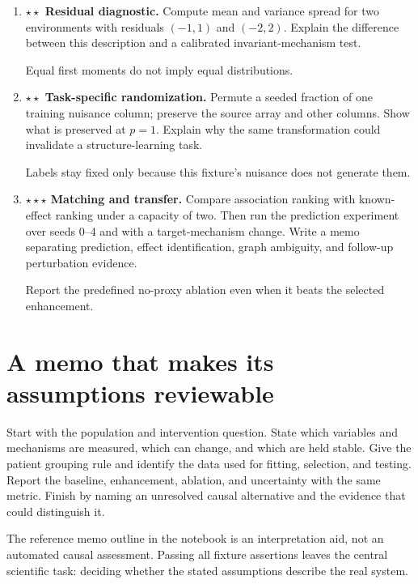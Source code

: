 \documentclass[11pt,oneside]{scrbook}
\begin{document}
\begin{enumerate}
\item \textbf{$\star\star$ Residual diagnostic.} Compute mean and variance spread for
two environments with residuals $(-1,1)$ and $(-2,2)$. Explain the difference between
this description and a calibrated invariant-mechanism test.
\begin{intuition}Equal first moments do not imply equal distributions.\end{intuition}

\item \textbf{$\star\star$ Task-specific randomization.} Permute a seeded fraction of
one training nuisance column; preserve the source array and other columns. Show what
is preserved at $p=1$. Explain why the same transformation could invalidate a
structure-learning task.
\begin{intuition}Labels stay fixed only because this fixture's nuisance does not generate them.\end{intuition}

\item \textbf{$\star\star\star$ Matching and transfer.} Compare association ranking
with known-effect ranking under a capacity of two. Then run the prediction experiment
over seeds 0--4 and with a target-mechanism change. Write a memo separating prediction,
effect identification, graph ambiguity, and follow-up perturbation evidence.
\begin{intuition}Report the predefined no-proxy ablation even when it beats the selected enhancement.\end{intuition}
\end{enumerate}

\section{A memo that makes its assumptions reviewable}
Start with the population and intervention question. State which variables and mechanisms
are measured, which can change, and which are held stable. Give the patient grouping rule
and identify the data used for fitting, selection, and testing. Report the baseline,
enhancement, ablation, and uncertainty with the same metric. Finish by naming an unresolved
causal alternative and the evidence that could distinguish it.

The reference memo outline in the notebook is an interpretation aid, not an automated
causal assessment. Passing all fixture assertions leaves the central scientific task:
deciding whether the stated assumptions describe the real system.
\end{document}
